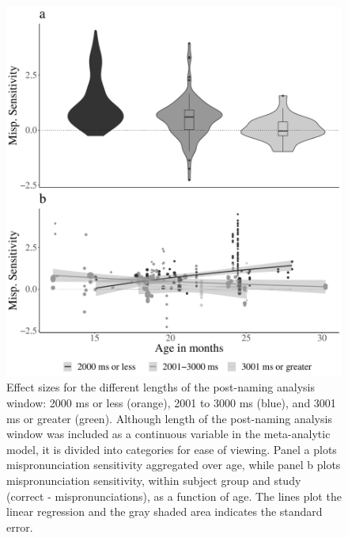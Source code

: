 \documentclass[
  man, noextraspace]{apa6}
\begin{document}
\begin{figure}
\centering
\includegraphics{VonHolzenBergmann_MPMetaAnalysis_files/figure-latex/PlotPostNameCondAge-1.pdf}
\caption{\label{fig:PlotPostNameCondAge}Effect sizes for the different lengths of the post-naming analysis window: 2000 ms or less (orange), 2001 to 3000 ms (blue), and 3001 ms or greater (green). Although length of the post-naming analysis window was included as a continuous variable in the meta-analytic model, it is divided into categories for ease of viewing. Panel a plots mispronunciation sensitivity aggregated over age, while panel b plots mispronunciation sensitivity, within subject group and study (correct - mispronunciations), as a function of age. The lines plot the linear regression and the gray shaded area indicates the standard error.}
\end{figure}
\end{document}
